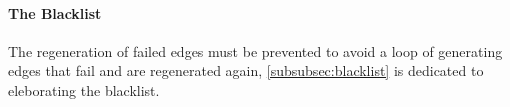 \paragraph{The Blacklist}%
 The regeneration of failed edges must be prevented to avoid a loop of generating edges that fail and are regenerated again, \cref{subsubsec:blacklist} is dedicated to eleborating the blacklist.



